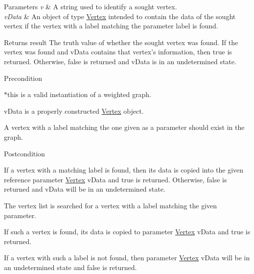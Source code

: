 \begin{DoxyParams}{\-Parameters}
{\em v} & \-A string used to identify a sought vertex. \\
\hline
{\em v\-Data} & \-An object of type \hyperlink{class_weighted_graph_1_1_vertex}{\-Vertex} intended to contain the data of the sought vertex if the vertex with a label matching the parameter label is found.\\
\hline
\end{DoxyParams}
\begin{DoxyReturn}{\-Returns}
result \-The truth value of whether the sought vertex was found. \-If the vertex was found and v\-Data contains that vertex's information, then true is returned. \-Otherwise, false is returned and v\-Data is in an undetermined state.
\end{DoxyReturn}
\begin{DoxyPrecond}{\-Precondition}

\begin{DoxyEnumerate}
\item $\ast$this is a valid instantiation of a weighted graph.
\item v\-Data is a properly constructed \hyperlink{class_weighted_graph_1_1_vertex}{\-Vertex} object.
\item \-A vertex with a label matching the one given as a parameter should exist in the graph.
\end{DoxyEnumerate}
\end{DoxyPrecond}
\begin{DoxyPostcond}{\-Postcondition}

\begin{DoxyEnumerate}
\item \-If a vertex with a matching label is found, then its data is copied into the given reference parameter \hyperlink{class_weighted_graph_1_1_vertex}{\-Vertex} v\-Data and true is returned. \-Otherwise, false is returned and v\-Data will be in an undetermined state.
\end{DoxyEnumerate}
\end{DoxyPostcond}

\begin{DoxyEnumerate}
\item \-The vertex list is searched for a vertex with a label matching the given parameter.
\item \-If such a vertex is found, its data is copied to parameter \hyperlink{class_weighted_graph_1_1_vertex}{\-Vertex} v\-Data and true is returned.
\item \-If a vertex with such a label is not found, then parameter \hyperlink{class_weighted_graph_1_1_vertex}{\-Vertex} v\-Data will be in an undetermined state and false is returned.
\end{DoxyEnumerate}


